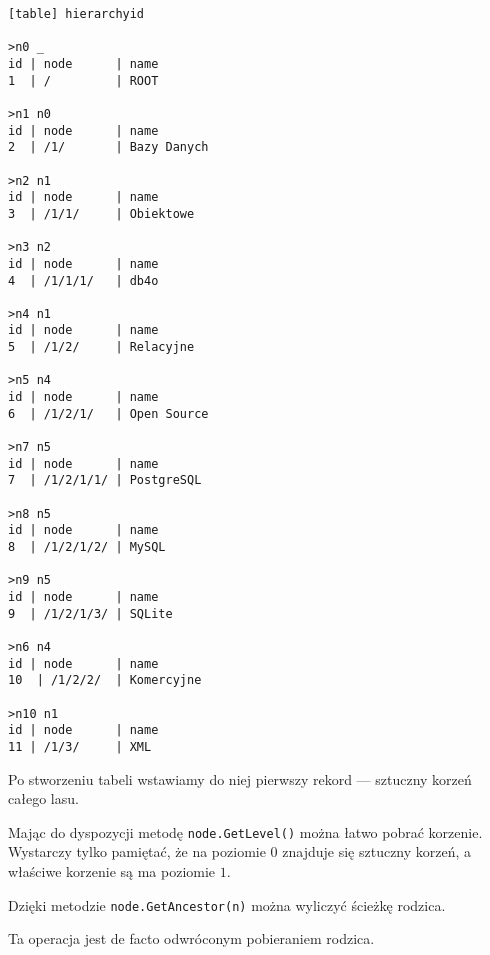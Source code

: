\begin{verbatim}[table] hierarchyid

>n0 _
id | node      | name
1  | /         | ROOT

>n1 n0
id | node      | name
2  | /1/       | Bazy Danych

>n2 n1
id | node      | name
3  | /1/1/     | Obiektowe

>n3 n2
id | node      | name
4  | /1/1/1/   | db4o

>n4 n1
id | node      | name
5  | /1/2/     | Relacyjne

>n5 n4
id | node      | name
6  | /1/2/1/   | Open Source

>n7 n5
id | node      | name
7  | /1/2/1/1/ | PostgreSQL

>n8 n5
id | node      | name
8  | /1/2/1/2/ | MySQL

>n9 n5
id | node      | name
9  | /1/2/1/3/ | SQLite

>n6 n4
id | node      | name
10  | /1/2/2/  | Komercyjne

>n10 n1
id | node      | name
11 | /1/3/     | XML

\end{verbatim}



Po stworzeniu tabeli wstawiamy do niej pierwszy rekord --- sztuczny korzeń całego lasu.




Mając do dyspozycji metodę \texttt{node.GetLevel()} można łatwo pobrać korzenie.
Wystarczy tylko pamiętać, że na poziomie $0$ znajduje się sztuczny korzeń, 
a właściwe korzenie są ma poziomie $1$.



Dzięki metodzie \texttt{node.GetAncestor(n)} można wyliczyć ścieżkę rodzica.



Ta operacja jest de facto odwróconym pobieraniem rodzica.



